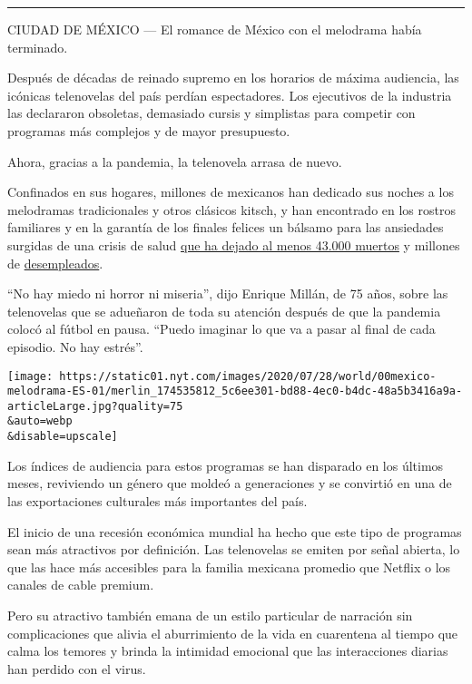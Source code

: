 \begin{center}\rule{0.5\linewidth}{\linethickness}\end{center}

CIUDAD DE MÉXICO --- El romance de México con el melodrama había
terminado.

Después de décadas de reinado supremo en los horarios de máxima
audiencia, las icónicas telenovelas del país perdían espectadores. Los
ejecutivos de la industria las declararon obsoletas, demasiado cursis y
simplistas para competir con programas más complejos y de mayor
presupuesto.

Ahora, gracias a la pandemia, la telenovela arrasa de nuevo.

Confinados en sus hogares, millones de mexicanos han dedicado sus noches
a los melodramas tradicionales y otros clásicos kitsch, y han encontrado
en los rostros familiares y en la garantía de los finales felices un
bálsamo para las ansiedades surgidas de una crisis de salud
\href{https://www.nytimes.com/es/interactive/2020/espanol/america-latina/coronavirus-en-mexico.html}{que
ha dejado al menos 43.000 muertos} y millones de
\href{https://www.nytimes.com/es/2020/06/08/espanol/america-latina/mexico-amlo-deuda-coronavirus.html}{desempleados}.

``No hay miedo ni horror ni miseria'', dijo Enrique Millán, de 75 años,
sobre las telenovelas que se adueñaron de toda su atención después de
que la pandemia colocó al fútbol en pausa. ``Puedo imaginar lo que va a
pasar al final de cada episodio. No hay estrés''.

\texttt{[image: https://static01.nyt.com/images/2020/07/28/world/00mexico-melodrama-ES-01/merlin\_174535812\_5c6ee301-bd88-4ec0-b4dc-48a5b3416a9a-articleLarge.jpg?quality=75\\\&auto=webp\\\&disable=upscale]}

Los índices de audiencia para estos programas se han disparado en los
últimos meses, reviviendo un género que moldeó a generaciones y se
convirtió en una de las exportaciones culturales más importantes del
país.

El inicio de una recesión económica mundial ha hecho que este tipo de
programas sean más atractivos por definición. Las telenovelas se emiten
por señal abierta, lo que las hace más accesibles para la familia
mexicana promedio que Netflix o los canales de cable premium.

Pero su atractivo también emana de un estilo particular de narración sin
complicaciones que alivia el aburrimiento de la vida en cuarentena al
tiempo que calma los temores y brinda la intimidad emocional que las
interacciones diarias han perdido con el virus.

